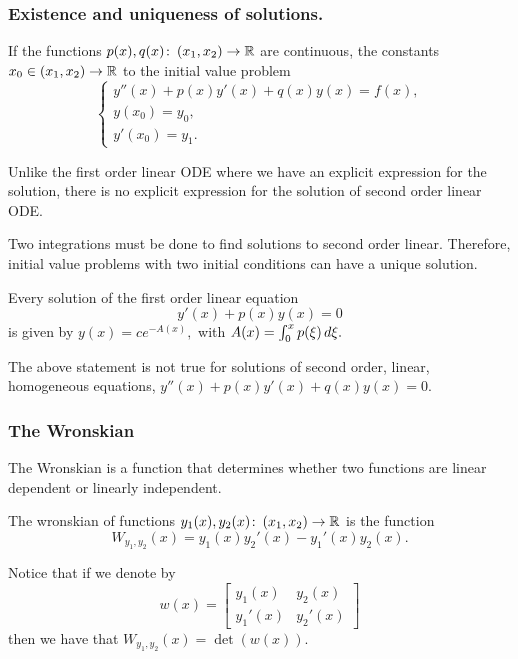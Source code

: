 \subsubsection{Existence and uniqueness of solutions.}
\bigskip
\begin{thm}
	If the functions $ p(x),q(x)\colon\left(x_1,x_2\right)\to \mathbb{R} $ are continuous, the constants $ x_0\in \left(x_1,x_2 \right)\to \mathbb{R} $ to the initial value problem
	\begin{equation}
	\begin{cases}
	y''(x)+p(x)y'(x)+q(x)y(x)=f(x),\\
	y(x_0)=y_0,\\
	y'(x_0)=y_1.
	\end{cases}
	\end{equation}
\end{thm}
\begin{rmk}
	Unlike the first order linear ODE where we have an explicit expression for the solution, there is no explicit expression for the solution of second order linear ODE.
\end{rmk}
\begin{rmk}
	Two integrations must be done to find solutions to second order linear. Therefore, initial value problems with two initial conditions can have a unique solution.
\end{rmk}
\begin{rec}
	Every solution of the first order linear equation
	\[y'(x)+p(x)y(x)=0 \]
	is given by $ y(x)=c e^{-A(x)}, $ with $ A(x)=\int_{0}^{x} p(\xi)\mathop{}\!d\xi. $
\end{rec}
\begin{rmk}
	The above statement is not true for solutions of second order, linear, homogeneous equations, $ y''(x)+p(x)y'(x)+q(x)y(x)=0. $
\end{rmk}
\subsubsection{The Wronskian}
\medskip
\begin{rmk}
	The Wronskian is a function that determines whether two functions are linear dependent or linearly independent.
\end{rmk}
\begin{mydef}
	The wronskian of functions $ y_1(x), y_2(x)\colon\left(x_1,x_2\right)\to \mathbb{R} $ is the function
	\[W_{y_1,y_2}(x)=y_1(x)y_2'(x)-y_1'(x)y_2(x). \]
\end{mydef}
Notice that if we denote by \[w(x)=\begin{bmatrix}
y_1(x) & y_2(x)\\
y_1'(x) & y_2'(x)
\end{bmatrix} \]
then we have that $ W_{y_1,y_2}(x)=\det(w(x)) $. 

